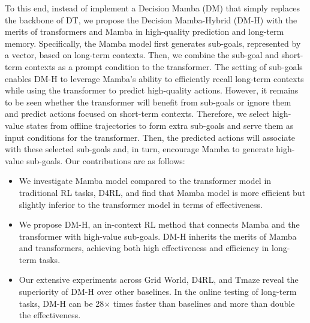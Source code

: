 \documentclass{article}
\begin{document}
To this end, instead of implement a Decision Mamba (DM) that simply replaces the backbone of DT, we propose the Decision Mamba-Hybrid (DM-H) with the merits of transformers and Mamba in high-quality prediction and long-term memory. Specifically, the Mamba model first generates sub-goals, represented by a vector, based on long-term contexts. Then, we combine the sub-goal and short-term contexts as a prompt condition to the transformer. The setting of sub-goals enables DM-H to leverage Mamba's ability to efficiently recall long-term contexts while using the transformer to predict high-quality actions. However, it remains to be seen whether the transformer will benefit from sub-goals or ignore them and predict actions focused on short-term contexts. Therefore, we select high-value states from offline trajectories to form extra sub-goals and serve them as input conditions for the transformer. Then, the predicted actions will associate with these selected sub-goals and, in turn, encourage Mamba to generate high-value sub-goals. Our contributions are as follows:
\begin{itemize}[noitemsep,leftmargin=*]
    \item We investigate Mamba model compared to the transformer model in traditional RL tasks, D4RL, and find that Mamba model is more efficient but slightly inferior to the transformer model in terms of effectiveness.
    \item We propose DM-H, an in-context RL method that connects Mamba and the transformer with high-value sub-goals. DM-H inherits the merits of Mamba and transformers, achieving both high effectiveness and efficiency in long-term tasks.
    \item Our extensive experiments across Grid World, D4RL, and Tmaze reveal the superiority of DM-H over other baselines. In the online testing of long-term tasks, DM-H can be 28$\times$ times faster than baselines and more than double the effectiveness.
\end{itemize}
\end{document}
